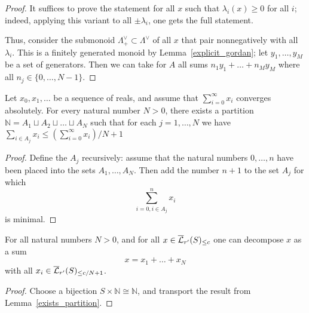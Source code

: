\begin{proof}
  \leanok
  It suffices to prove the statement for all $x$ such that $\lambda_i(x)\geq 0$ for all $i$;
  indeed, applying this variant to all $\pm \lambda_i$, one gets the full statement.

  Thus, consider the submonoid $\Lambda^\vee_+\subset \Lambda^\vee$
  of all $x$ that pair nonnegatively with all $\lambda_i$.
  This is a finitely generated monoid by Lemma~\ref{explicit_gordan};
  let $y_1,\ldots,y_M$ be a set of generators.
  Then we can take for $A$ all sums $n_1y_1+\ldots+n_My_M$ where all $n_j\in \{0,\ldots,N-1\}$.
\end{proof}

\begin{lemma}
  \label{exists_partition}
  \leanok
  Let $x_0, x_1, \dots$ be a sequence of reals,
  and assume that $\sum_{i=0}^\infty x_i$ converges absolutely.
  For every natural number $N > 0$,
  there exists a partition $\mathbb N = A_1 \sqcup A_2 \sqcup \dots \sqcup A_N$
  such that for each $j = 1,\dots,N$ we have
  $\sum_{i \in A_j} x_i \le (\sum_{i=0}^\infty x_i)/N + 1$
\end{lemma}

\begin{proof}
  \leanok
  Define the $A_j$ recursively:
  assume that the natural numbers $0, \dots, n$
  have been placed into the sets $A_1, \dots, A_N$.
  Then add the number $n+1$ to the set $A_j$ for which
  \[
    \sum_{i=0, i\in A_j}^n x_i
  \]
  is minimal.
\end{proof}

\begin{lemma}
  \label{lem98_int}
  \leanok
  For all natural numbers $N > 0$,
  and for all $x\in \overline{\mathcal L}_{r'}(S)_{\leq c}$
  one can decompose $x$ as a sum
  \[
    x=x_1+\ldots+x_N
  \]
  with all $x_i\in \overline{\mathcal L}_{r'}(S)_{\leq c/N+1}$.
\end{lemma}

\begin{proof}
  \leanok
  Choose a bijection $S \times \mathbb N \cong \mathbb N$,
  and transport the result from Lemma~\ref{exists_partition}.
\end{proof}

